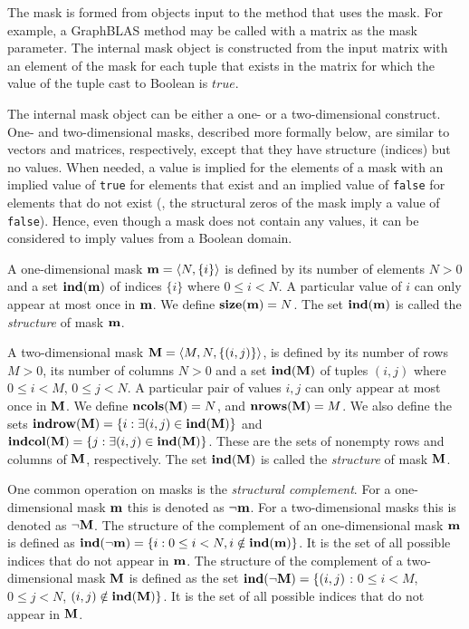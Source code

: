 The mask is formed from objects input to the method that uses 
the mask.  For example, a GraphBLAS method may be called with a matrix as the mask
parameter.   The internal mask object is constructed from the input matrix with an element of the 
mask for each tuple that exists in the matrix for which the value of the tuple 
cast to Boolean is $true$.

The internal mask object can be either a one- or a two-dimensional construct.  One- and
two-dimensional masks, described more formally below, are similar to
vectors and matrices, respectively, except that they have structure
(indices) but no values.  When needed, a value is implied for the elements of a 
mask with an implied value of {\tt true} for elements that exist 
and an implied value of {\tt false} for elements that do not exist (\ie,
the structural zeros of the mask imply a value of {\tt false}).
Hence, even though a mask does not contain any values, it can be 
considered to imply values from a Boolean domain.

A one-dimensional mask ${\bf m} = \langle N, \{ i \} \rangle$ is
defined by its number of elements $N>0$ and a set $\mathbf{ind}({\bf m})$
of indices $\{ i \}$ where $0 \leq i < N$.  A particular value of $i$ can
only appear at most once in ${\bf m}$. We define $\mathbf{size}({\bf m})
= N$. The set $\mathbf{ind}({\bf m})$ is called the \emph{structure} of mask ${\bf m}$.

A two-dimensional mask ${\bf M} = \langle M, N, \{ (i,j) \}
\rangle$, is defined by its number of rows $M>0$, its number of
columns $N>0$ and a set $\mathbf{ind}({\bf M})$ of tuples $(i,j)$
where $0 \leq i < M$, $0 \leq j < N$.   A particular pair of values
$i,j$ can only appear at most once in ${\bf M}$.  We define
$\mathbf{ncols}({\bf M}) = N$, and $\mathbf{nrows}({\bf M}) = M$.
We also define the sets ${\bf indrow({\bf M})} = \{ i : \exists
(i,j) \in \mathbf{ind}({\bf M}) \}$ and ${\bf indcol({\bf M})}
= \{ j : \exists (i,j) \in \mathbf{ind}({\bf M}) \}$.  These are
the sets of nonempty rows and columns of ${\bf M}$, respectively.
The set $\mathbf{ind}({\bf M})$ is called the \emph{structure} of mask ${\bf M}$.

One common operation on masks is the \emph{structural complement}.
For a one-dimensional mask ${\bf m}$ this is denoted as
$\neg{\bf m}$. For a two-dimensional masks this is denoted as
$\neg{\bf M}$.  The structure of the complement of an one-dimensional
mask ${\bf m}$ is defined as $\mathbf{ind}(\neg{\bf m}) = \{i : 0
\leq i < N, i \notin \mathbf{ind}({\bf m}) \}$.  It is the set of all
possible indices that do not appear in ${\bf m}$.  The structure
of the complement of a two-dimensional mask ${\bf M}$ is defined as the set
$\mathbf{ind}(\neg{\bf M}) = \{(i,j)$ : $0 \leq i < M$, $0 \leq j < N$,
$(i,j) \notin \mathbf{ind}({\bf M}) \}$.  It is the set of all possible
indices that do not appear in ${\bf M}$.


